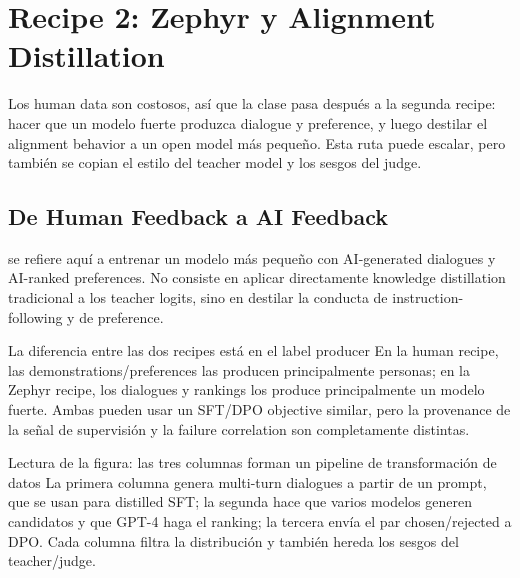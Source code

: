 \section{Recipe 2: Zephyr y Alignment Distillation}

Los human data son costosos, así que la clase pasa después a la segunda recipe: hacer que un modelo fuerte produzca dialogue y preference, y luego destilar el alignment behavior a un open model más pequeño. Esta ruta puede escalar, pero también se copian el estilo del teacher model y los sesgos del judge.

\subsection{De Human Feedback a AI Feedback}

 se refiere aquí a entrenar un modelo más pequeño con AI-generated dialogues y AI-ranked preferences. No consiste en aplicar directamente knowledge distillation tradicional a los teacher logits, sino en destilar la conducta de instruction-following y de preference.


\begin{importantbox}{La diferencia entre las dos recipes está en el label producer}
En la human recipe, las demonstrations/preferences las producen principalmente personas; en la Zephyr recipe, los dialogues y rankings los produce principalmente un modelo fuerte. Ambas pueden usar un SFT/DPO objective similar, pero la provenance de la señal de supervisión y la failure correlation son completamente distintas.
\end{importantbox}


\begin{knowledgebox}{Lectura de la figura: las tres columnas forman un pipeline de transformación de datos}
La primera columna genera multi-turn dialogues a partir de un prompt, que se usan para distilled SFT; la segunda hace que varios modelos generen candidatos y que GPT-4 haga el ranking; la tercera envía el par chosen/rejected a DPO. Cada columna filtra la distribución y también hereda los sesgos del teacher/judge.
\end{knowledgebox}

